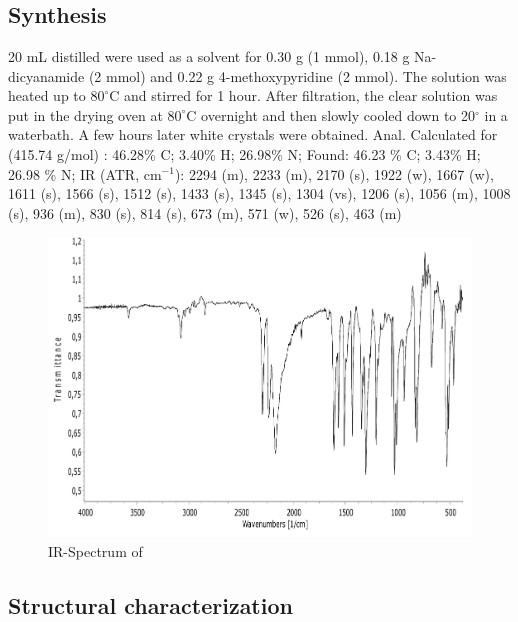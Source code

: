 \section{}
\subsection{Synthesis}
20 mL distilled  were used as a solvent for 0.30 g  (1 mmol), 0.18 g Na-dicyanamide (2 mmol) and 0.22 g 4-methoxypyridine (2 mmol). The solution was heated up to $80^\circ$C  and stirred for 1 hour. After filtration, the clear  solution was put in the drying oven at $80^\circ$C overnight and then slowly cooled down to 20$^\circ$ in a waterbath. A few hours later white crystals were obtained.
Anal. Calculated for  (415.74 g/mol) : 46.28\% C; 3.40\% H; 26.98\% N;
Found: 46.23 \% C; 3.43\% H; 26.98 \% N;
 IR (ATR, cm$^{-1}$): 2294 (m), 2233 (m), 2170 (s), 1922 (w), 1667 (w), 1611 (s), 1566 (s), 1512 (s), 1433 (s), 1345 (s), 1304 (vs), 1206 (s), 1056 (m), 1008 (s), 936 (m), 830 (s), 814 (s), 673 (m), 571 (w), 526 (s), 463 (m)

\begin{figure}[h!]
\centering
\includegraphics[width=1\textwidth]{figures/ZnD4MOP-IR.pdf}
\caption{IR-Spectrum of }
\end{figure}

\subsection{Structural characterization}


